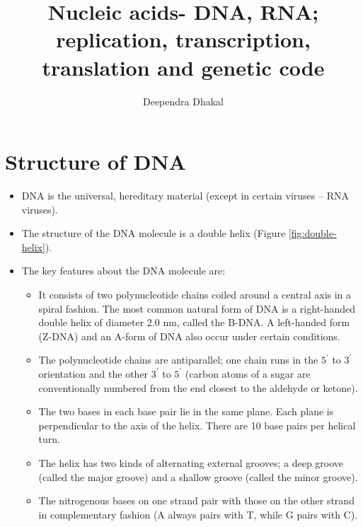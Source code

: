 \documentclass[11pt,ignorenonframetext,aspectratio=169]{beamer}
\title[]{Nucleic acids- DNA, RNA; replication, transcription,
translation and genetic code}
\author[
        Deependra Dhakal
    ]{Deependra Dhakal}
\institute[
    ]{
    Agriculture and Forestry University\\
\textit{ddhakal.rookie@gmail.com}\\
\url{https://rookie.rbind.io}
    }
\date[
      
  ]{
    }
\providecommand{\tightlist}{%
  \setlength{\itemsep}{0pt}\setlength{\parskip}{0pt}}
\begin{document}
  \begin{frame}[plain]
  \titlepage
  \end{frame}



\hypertarget{structure-of-dna}{%
\section{Structure of DNA}\label{structure-of-dna}}

\begin{frame}{}
\protect\hypertarget{section}{}
\begin{itemize}
\tightlist
\item
  DNA is the universal, hereditary material (except in certain viruses
  -- RNA viruses).
\item
  The structure of the DNA molecule is a double helix (Figure
  \ref{fig:double-helix}).
\item
  The key features about the DNA molecule are:

  \begin{itemize}
  \tightlist
  \item
    It consists of two polynucleotide chains coiled around a central
    axis in a spiral fashion. The most common natural form of DNA is a
    right-handed double helix of diameter 2.0 nm, called the B-DNA. A
    left-handed form (Z-DNA) and an A-form of DNA also occur under
    certain conditions.
  \item
    The polynucleotide chains are antiparallel; one chain runs in the
    \(5^\prime\) to \(3^\prime\) orientation and the other \(3^\prime\)
    to \(5^\prime\) (carbon atoms of a sugar are conventionally numbered
    from the end closest to the aldehyde or ketone).
  \item
    The two bases in each base pair lie in the same plane. Each plane is
    perpendicular to the axis of the helix. There are 10 base pairs per
    helical turn.
  \item
    The helix has two kinds of alternating external grooves; a deep
    groove (called the major groove) and a shallow groove (called the
    minor groove).
  \item
    The nitrogenous bases on one strand pair with those on the other
    strand in complementary fashion (A always pairs with T, while G
    pairs with C).
  \end{itemize}
\end{itemize}
\end{frame}
\end{document}
